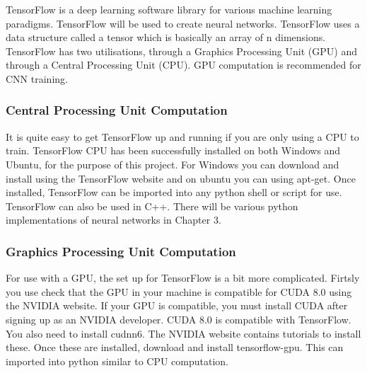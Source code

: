 TensorFlow is a deep learning software library for various machine learning paradigms. TensorFlow will be used to create neural networks.
TensorFlow uses a data structure called a tensor which is basically an array of n dimensions.
TensorFlow has two utilisations, through a Graphics Processing Unit (GPU) and through a Central Processing Unit (CPU).
GPU computation is recommended for CNN training. 

\tocless\subsubsection{Central Processing Unit Computation}
It is quite easy to get TensorFlow up and running if you are only using a CPU to
train. TensorFlow CPU has been successfully installed on both Windows and Ubuntu, for the purpose of this project.
For Windows you can download and install using the TensorFlow website and on ubuntu you can
using apt-get. Once installed, TensorFlow can be imported into any python shell
or script for use. TensorFlow can also be used in C++. There will be various
python implementations of neural networks in Chapter 3.

\tocless\subsubsection{Graphics Processing Unit Computation}
For use with a GPU, the set up for TensorFlow is a bit more complicated. Firtsly
you use check that the GPU in your machine is compatible for CUDA 8.0 using the
NVIDIA website. If your GPU is compatible, you must install CUDA after signing
up as an NVIDIA developer. CUDA 8.0 is compatible with TensorFlow. You also need
to install cudnn6. The NVIDIA website contains tutorials to install these. Once
these are installed, download and install tensorflow-gpu. This can imported into
python similar to CPU computation.
